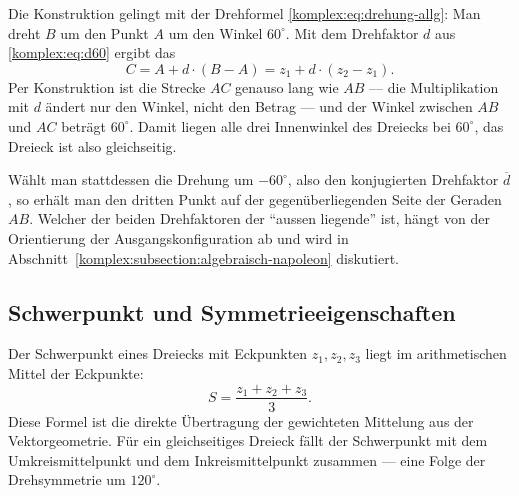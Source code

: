 

Die Konstruktion gelingt mit der Drehformel
\eqref{komplex:eq:drehung-allg}:
Man dreht $B$ um den Punkt $A$ um den Winkel $60^\circ$.
Mit dem Drehfaktor $d$ aus \eqref{komplex:eq:d60} ergibt das
\begin{equation}
C
=
A + d \cdot (B - A)
=
z_1 + d \cdot (z_2 - z_1) .
\label{komplex:eq:dreieck}
\end{equation}
Per Konstruktion ist die Strecke $AC$ genauso lang wie $AB$ ---
die Multiplikation mit $d$ ändert nur den Winkel, nicht den Betrag ---
und der Winkel zwischen $AB$ und $AC$ beträgt $60^\circ$.
Damit liegen alle drei Innenwinkel des Dreiecks bei $60^\circ$,
das Dreieck ist also gleichseitig.

Wählt man stattdessen die Drehung um $-60^\circ$, also den konjugierten
Drehfaktor $\overline{d}$, so erhält man den dritten Punkt auf der
gegenüberliegenden Seite der Geraden $AB$.
Welcher der beiden Drehfaktoren der ``aussen liegende'' ist,
hängt von der Orientierung der Ausgangskonfiguration ab und wird in
Abschnitt~\ref{komplex:subsection:algebraisch-napoleon} diskutiert.

%
%
\subsection{Schwerpunkt und Symmetrieeigenschaften
\label{komplex:subsection:schwerpunkt}}
Der Schwerpunkt eines Dreiecks mit Eckpunkten $z_1, z_2, z_3$
%
liegt im arithmetischen Mittel der Eckpunkte:
%
%
\begin{equation}
S
=
\frac{z_1 + z_2 + z_3}{3} .
\label{komplex:eq:schwerpunkt}
\end{equation}
Diese Formel ist die direkte Übertragung der gewichteten Mittelung aus der
Vektorgeometrie.
%
Für ein gleichseitiges Dreieck fällt der Schwerpunkt mit dem
Umkreismittelpunkt und dem Inkreismittelpunkt zusammen ---
%
%
eine Folge der Drehsymmetrie um $120^\circ$.

%
%

